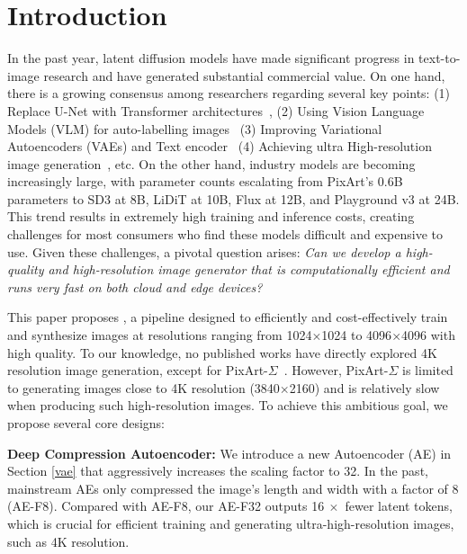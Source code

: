 \section{Introduction}
\label{sec:intro}

In the past year, latent diffusion models have made significant progress in text-to-image research and have generated substantial commercial value. On one hand, there is a growing consensus among researchers regarding several key points: (1) Replace U-Net with Transformer architectures~\citep{chenpixart,chen2024pixart,esser2024scaling, FLUX}, (2) Using Vision Language Models (VLM) for auto-labelling images~\citep{chenpixart,Dalle-3,zhuo2024lumina,liu2024playground} (3) Improving Variational Autoencoders (VAEs) and Text encoder~\citep{podell2023sdxl,esser2024scaling,dai2023emu} (4) Achieving ultra High-resolution image generation~\citep{chen2024pixart}, etc. On the other hand, industry models are becoming increasingly large, with parameter counts escalating from PixArt's 0.6B parameters to SD3 at 8B, LiDiT at 10B, Flux at 12B, and Playground v3 at 24B. This trend results in extremely high training and inference costs, creating challenges for most consumers who find these models difficult and expensive to use. Given these challenges, a pivotal question arises: \textit{Can we develop a high-quality and high-resolution image generator that is computationally efficient and runs very fast on both cloud and edge devices?}



This paper proposes \model{}, a pipeline designed to efficiently and cost-effectively train and synthesize images at resolutions ranging from 1024$\times$1024 to 4096$\times$4096 with high quality. To our knowledge, no published works have directly explored 4K resolution image generation, except for PixArt-$\Sigma$~\citep{chen2024pixart}. However, PixArt-$\Sigma$ is limited to generating images close to 4K resolution (3840$\times$2160) and is relatively slow when producing such high-resolution images. To achieve this ambitious goal, we propose several core designs:

\textbf{Deep Compression Autoencoder:}
We introduce a new Autoencoder (AE) in Section \ref{vae} that aggressively increases the scaling factor to 32. In the past, mainstream AEs only compressed the image's length and width with a factor of 8 (AE-F8). Compared with AE-F8, our AE-F32 outputs 16$~\times$ fewer latent tokens, which is crucial for efficient training and generating ultra-high-resolution images, such as 4K resolution.

